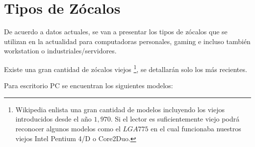 \documentclass[conference]{IEEEtran}
\begin{document}
    \section{Tipos de Zócalos}

    De acuerdo a datos actuales, se van a presentar los tipos de zócalos que
    se utilizan en la actualidad para computadoras personales, gaming e
    incluso también workstation o industriales/servidores.

    \bigbreak

    Existe una gran cantidad de zócalos viejos \footnote{Wikipedia
    \cite{wikipedia-contributors-2022} enlista una gran cantidad de modelos
    incluyendo los viejos introducidos desde el año $1,970$. Si el lector es
    suficientemente viejo podrá reconocer algunos modelos como el $LGA 775$
        en el cual funcionaba nuestros viejos Intel Pentium 4/D o Core2Duo.},
    se detallarán solo los más recientes.

    \bigbreak

    Para escritorio PC se encuentran los siguientes modelos:
\end{document}
